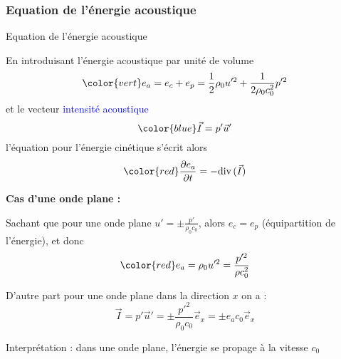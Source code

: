 \subsubsection{Equation de l'énergie acoustique}
\begin{frame}{Equation de l'énergie acoustique}

\small

En introduisant l'\textcolor{vert}{énergie acoustique} par unité de volume
\[
	\color{vert}
	e_a = e_c + e_p = \frac{1}{2} \rho_0 u'^2 + \frac{1}{2\rho_0 c_0^2} p'^2
\]
\pause
et le vecteur \textcolor{blue}{intensité acoustique} 
\[
	\color{blue}
	\vec{I} = p' \vec{u}'
\]
\pause
l'équation pour l'énergie cinétique  s'écrit alors
\[
	\color{red}
	\dpdt{e_a} = - \divergence (\vec{I})	
\]

\pause

\bigskip

\textbf{Cas d'une onde plane :} \medskip

Sachant que pour une onde plane $u' =  \pm \frac{p'}{\rho_0 c_0}$, alors $e_c =  e_p$ (équipartition de l'énergie), et donc
\[
	\color{red}
	e_a =  \rho_0 u'^2 = \frac{p'^2}{\rho c_0^2}
\]

D'autre part pour une onde plane dans la direction $x$ on a :
\[
\vec{I} = p' \vec{u}' = \pm \frac{p'^2}{\rho_0 c_0} \vec{e}_x = \pm e_a c_0 \vec e_x
\]

Interprétation : dans une onde plane, l'énergie se propage à la vitesse $c_0$

\vspace{0mm}

\end{frame}


